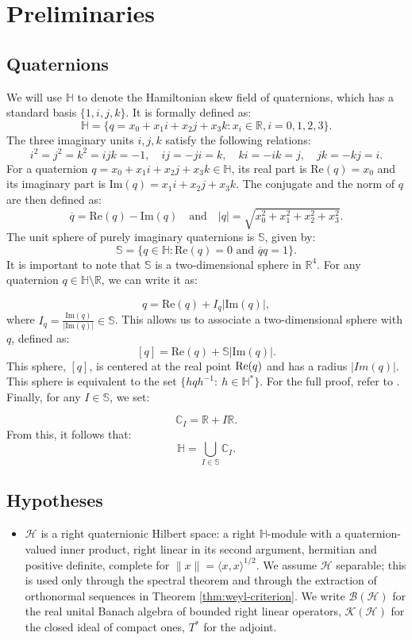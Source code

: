 \documentclass[12pt,a4paper]{article}
\theoremstyle{plain}
\theoremstyle{definition}
\theoremstyle{remark}
\newcommand{\HH}{\mathbb H}
\newcommand{\BB}{\mathcal B}
\newcommand{\KK}{\mathcal K}
\newcommand{\HS}{\mathcal H}
\begin{document}
{\section{Preliminaries}
\label{sec:prelim}

\subsection{Quaternions}
We will use $\mathbb{H}$ to denote the Hamiltonian skew field of quaternions, which has a standard basis $\{1,i,j,k\}$. It is formally defined as: $$\mathbb{H} = \{q = x_0 + x_1i + x_2j + x_3k : x_i \in \mathbb{R}, i = 0, 1, 2, 3\}.$$The three imaginary units $i,j,k$ satisfy the following  relations:$$i^2 = j^2 = k^2 = ijk = -1, \quad ij = -ji = k, \quad ki = -ik = j, \quad jk = -kj = i.$$
For a quaternion $q = x_0 + x_1i + x_2j + x_3k \in \mathbb{H}$, its real part is $\text{Re}(q) = x_0$ and its imaginary part is $\text{Im}(q) = x_1i + x_2j + x_3k$. The conjugate and the norm of $q$ are then defined as:
$$\overline{q} = \text{Re}(q) - \text{Im}(q) \quad \text{and} \quad |q| = \sqrt{x_0^2 + x_1^2 + x_2^2 + x_3^2}.$$
The unit sphere of purely imaginary quaternions is $\mathbb{S}$, given by:
$$\mathbb{S} = \{q \in \mathbb{H} : \text{Re}(q) = 0 \text{ and } \overline{q}q = 1\}.$$
It is important to note that $\mathbb{S}$ is a two-dimensional sphere in $\mathbb{R}^4$. For any quaternion $q\in\mathbb{H}\setminus\mathbb{R}$, we can write it as:

$$q = \text{Re}(q) + I_q|\text{Im}(q)|,$$where $I_q = \frac{\text{Im}(q)}{|\text{Im}(q)|} \in \mathbb{S}$. This allows us to associate a two-dimensional sphere with $q$, defined as:$$[q] = \text{Re}(q) + \mathbb{S}|\text{Im}(q)|.$$
This sphere, $[q]$, is centered at the real point ${\rm Re}(q)$ and has a radius  $|Im(q)|$. This sphere is equivalent to the set
$\{hqh^{-1}:\ h\in \mathbb{H}^*\}$. For the full proof, refer to
\cite[Chapter 2]{ColomboGantnerKimsey2018}.
Finally, for any $I\in\mathbb{S}$, we set:

$$\mathbb{C}_I = \mathbb{R} + I\mathbb{R}.$$From this, it follows that:$$\mathbb{H} = \bigcup_{I \in \mathbb{S}} \mathbb{C}_I.$$


\subsection{Hypotheses}

\begin{itemize}[leftmargin=3em]
\item[(A1)] $\HS$ is a right quaternionic Hilbert space: a right
$\HH$-module with a quaternion-valued inner product, right linear in
its second argument, hermitian and positive definite, complete for
$\|x\|=\langle x,x\rangle^{1/2}$. We assume $\HS$ separable; this is
used only through the spectral theorem
and through the extraction of orthonormal sequences in Theorem
\ref{thm:weyl-criterion}. We write $\BB(\HS)$ for the real unital
Banach algebra of bounded right linear operators, $\KK(\HS)$ for the
closed ideal of compact ones, $T^*$ for the adjoint.


\end{itemize}}
\end{document}

